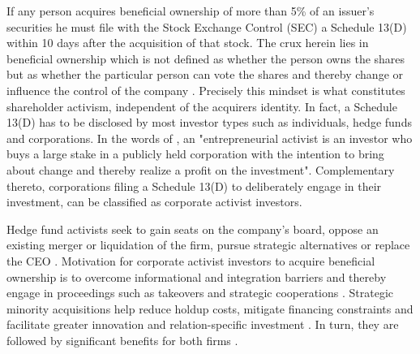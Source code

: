 \documentclass[12pt]{article}
\begin{document}
If any person acquires beneficial ownership of more than 5\% of an issuer's securities he must file with the Stock Exchange Control (SEC) a Schedule 13(D) within 10 days after the acquisition of that stock. The crux herein lies in beneficial ownership which is not defined as whether the person owns the shares but as whether the particular person can vote the shares and thereby change or influence the control of the company \citep[p.24]{Morrison2015}. Precisely this mindset is what constitutes shareholder activism, independent of the acquirers identity. In fact, a Schedule 13(D) has to be disclosed by most investor types such as individuals, hedge funds and corporations. In the words of \citet[p.187]{Klein2009}, an "entrepreneurial activist is an investor who buys a large stake in a publicly held corporation with the intention to bring about change and thereby realize a profit on the investment". Complementary thereto, corporations filing a Schedule 13(D) to deliberately engage in their investment, can be classified as corporate activist investors. 

Hedge fund activists seek to gain seats on the company's board, oppose an existing merger or liquidation of the firm, pursue strategic alternatives or replace the CEO \citep[p.188]{Klein2009}. Motivation for corporate activist investors to acquire beneficial ownership is to overcome informational and integration barriers and thereby engage in proceedings such as takeovers and strategic cooperations \citep[p.1]{Huang2017}. Strategic minority acquisitions help reduce holdup costs, mitigate financing constraints and facilitate greater innovation and relation-specific investment \citep[p.825]{Wang2014}. In turn, they are followed by significant benefits for both firms \citep[p.2793]{Allen2000}.
\end{document}
